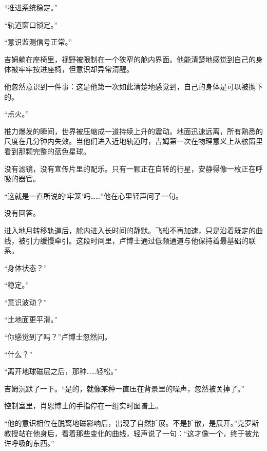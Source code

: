 “推进系统稳定。”

“轨道窗口锁定。”

“意识监测信号正常。”

吉姆躺在座椅里，视野被限制在一个狭窄的舱内界面。他能清楚地感觉到自己的身体被牢牢按进座椅，但意识却异常清醒。

他忽然意识到一件事：这是他第一次如此清楚地感觉到，自己的身体是可以被抛下的。

“点火。”

推力爆发的瞬间，世界被压缩成一道持续上升的震动。地面迅速远离，所有熟悉的尺度在几分钟内失效。当他们进入近地轨道时，吉姆第一次在物理意义上从舷窗里看到那颗完整的蓝色星球。

没有滤镜，没有宣传片里的配乐。只有一颗正在自转的行星，安静得像一枚正在呼吸的器官。

“这就是一直所说的‘牢笼’吗……”他在心里轻声问了一句。

没有回答。

进入地月转移轨道后，舱内进入长时间的静默。飞船不再加速，只是沿着既定的曲线，被引力缓慢牵引。这段时间里，卢博士通过低频通道与他保持着最基础的联系。

“身体状态？”

“稳定。”

“意识波动？”

“比地面更平滑。”

“你感觉到了吗？”卢博士忽然问。

“什么？”

“离开地球磁层之后，那种……轻松。”

吉姆沉默了一下。“是的，就像某种一直压在背景里的噪声，忽然被关掉了。”

控制室里，肖恩博士的手指停在一组实时图谱上。

“他的意识相位在脱离地磁影响后，出现了自然扩展。不是扩散，是展开。”克罗斯教授站在他身后，看着那些变化的曲线，轻声说了一句：“这才像一个，终于被允许呼吸的东西。”
